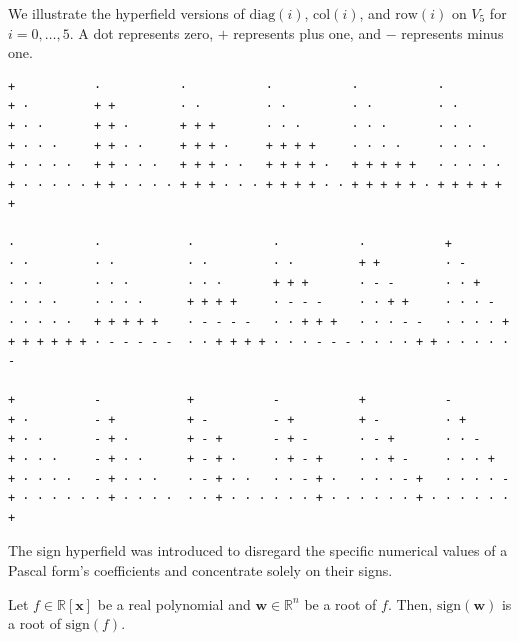 \begin{example}\label{ex:sign-hyperfield03242}
    We illustrate the hyperfield versions of \( \mathrm{diag}(i) \), \( \mathrm{col}(i) \), and \( \mathrm{row}(i) \) on \( V_5 \) for \( i = 0, \dots, 5 \). A dot represents zero, \( + \) represents plus one, and \( - \) represents minus one.
    \begin{verbatim}
+           ·           ·           ·           ·           ·
+ ·         + +         · ·         · ·         · ·         · ·
+ · ·       + + ·       + + +       · · ·       · · ·       · · ·
+ · · ·     + + · ·     + + + ·     + + + +     · · · ·     · · · ·
+ · · · ·   + + · · ·   + + + · ·   + + + + ·   + + + + +   · · · · ·
+ · · · · · + + · · · · + + + · · · + + + + · · + + + + + · + + + + + +

·           ·            ·           ·           ·           +
· ·         · ·          · ·         · ·         + +         · -
· · ·       · · ·        · · ·       + + +       · - -       · · +
· · · ·     · · · ·      + + + +     · - - -     · · + +     · · · -
· · · · ·   + + + + +    · - - - -   · · + + +   · · · - -   · · · · +
+ + + + + + · - - - - -  · · + + + + · · · - - - · · · · + + · · · · · -

+           -            +           -           +           -
+ ·         - +          + -         - +         + -         · +
+ · ·       - + ·        + - +       - + -       · - +       · · -
+ · · ·     - + · ·      + - + ·     · + - +     · · + -     · · · +
+ · · · ·   - + · · ·    · - + · ·   · · - + ·   · · · - +   · · · · -
+ · · · · · · + · · · ·  · · + · · · · · · + · · · · · · + · · · · · · +
    \end{verbatim}
\end{example}


The sign hyperfield was introduced to disregard the specific numerical values of a Pascal form's coefficients and concentrate solely on their signs.

\begin{proposition}\label{prop:sign-sikjsfnf}
    Let \( f \in \mathbb{R}[\mathbf{x}] \) be a real polynomial and \( \mathbf{w} \in \mathbb{R}^n \) be a root of \( f \). Then, \( \mathrm{sign}(\mathbf{w}) \) is a root of \( \mathrm{sign}(f) \).
\end{proposition}

